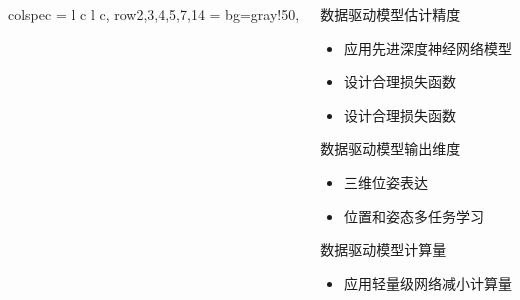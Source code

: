\begin{frame}
\begin{columns}[t]
\begin{column}[t]{0.5\textwidth}
{\begin{tblr}{
			  colspec = {l c l c},
			  row{2,3,4,5,7,14} = {bg=gray!50},
			}
				\bottomrule
			\end{tblr}     
		}
		\end{column}
		\begin{column}[t]{0.5\textwidth}
		    \vspace{-3.0cm}
			\begin{block}{数据驱动模型估计精度}
			    {
			        \footnotesize
					\begin{itemize}
						\item 应用先进深度神经网络模型
						\item 设计合理损失函数
						\item 设计合理损失函数
					\end{itemize}			    
			    }
			\end{block}
		    \begin{block}{数据驱动模型输出维度}
  			    {
  			        \footnotesize
					\begin{itemize}
						\item 三维位姿表达
						\item 位置和姿态多任务学习
					\end{itemize}
				}
			\end{block}
			\begin{block}{数据驱动模型计算量}
			    {
			        \footnotesize
					\begin{itemize}
						\item 应用轻量级网络减小计算量
					\end{itemize}
				}
			\end{block}
		\end{column}
	\end{columns}	
\end{frame}

